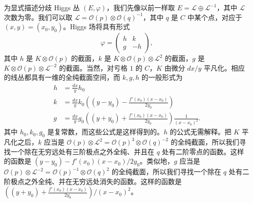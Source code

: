 为显式描述分歧 Higgs 丛 $(E,\varphi)$，我们先像以前一样取 $E=\mathcal{L}\oplus\mathcal{L}^{-1}$，其中 $\mathcal{L}$ 次数为零。我们可以取 $\mathcal{L}=\mathcal{O}(p)\otimes\mathcal{O}(q)^{-1}$，其中 $q$ 是 $C$ 中某个点，对应于 $(x,y)=(x_0,y_0)$。Higgs 场将具有形式
\begin{equation}\tag{3.8}
\varphi=
\begin{pmatrix}
h & k\\
g & -h
\end{pmatrix},
\end{equation}
其中 $h$ 是 $K\otimes\mathcal{O}(p)$ 的截面，$k$ 是 $K\otimes\mathcal{O}(p)\otimes\mathcal{L}^2$ 的截面，$g$ 是 $K\otimes\mathcal{O}(p)\otimes\mathcal{L}^{-2}$ 的截面。当然，对亏格 $1$ 的 $C$，$K$ 由微分 $dx/y$ 平凡化。相应的线丛都具有一维的全纯截面空间，而 $k,g,h$ 的一般形式为
\begin{equation}\tag{3.9}
\begin{aligned}
h &= \frac{dx}{y}h_0\\
k &= \frac{dx}{y}k_0\left((y-y_0)-\frac{f'(x_0)(x-x_0)}{2y_0}\right)\\
g &= \frac{dx}{y}g_0\left((y+y_0)+\frac{f'(x_0)(x-x_0)}{2y_0}\right)\frac{1}{(x-x_0)^2}.
\end{aligned}
\end{equation}
其中 $h_0,k_0,g_0$ 是复常数，而这些公式是这样得到的。$h$ 的公式无需解释。把 $K$ 平凡化之后，$k$ 应当是 $\mathcal{O}(p)\otimes\mathcal{L}^2=\mathcal{O}(p)^3\otimes\mathcal{O}(q)^{-2}$ 的全纯截面，所以我们寻找一个除在无穷远处有三阶极点之外全纯、并且在 $q$ 处有二阶零点的函数。这样的函数是 $(y-y_0)-f'(x_0)(x-x_0)/2y_0$。类似地，$g$ 应当是 $\mathcal{O}(p)\otimes\mathcal{L}^{-2}=\mathcal{O}(p)^{-1}\otimes\mathcal{O}(q)^2$ 的全纯截面，所以我们寻找一个除在 $q$ 处有二阶极点之外全纯、并在无穷远处消失的函数。这样的函数是 $\left((y+y_0)+\frac{f'(x_0)(x-x_0)}{2y_0}\right)/(x-x_0)^2$。

